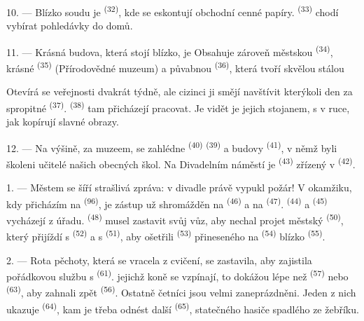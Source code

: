 10. --- Blízko soudu je  \textsuperscript{(32)}, kde se eskontují
obchodní cenné papíry.  \textsuperscript{(33)} chodí vybírat
pohledávky do domů.

\VUsaut{4.0mm}
\VUsaut{3.4mm}

11. --- Krásná budova, která stojí blízko, je  Obsahuje zároveň
městskou  \textsuperscript{(34)}, krásné  \textsuperscript{(35)} (Přírodovědné muzeum) a půvabnou 
\textsuperscript{(36)}, která tvoří skvělou stálou 

Otevírá se veřejnosti dvakrát týdně, ale cizinci ji smějí navštívit kterýkoli den za
spropitné  \textsuperscript{(37)}. 
\textsuperscript{(38)} tam přicházejí pracovat. Je vidět je  jejich
stojanem, s  v ruce, jak kopírují slavné obrazy.

12. --- Na výšině, za muzeem, se zahlédne  \textsuperscript{(40)}
 \textsuperscript{(39)} a budovy 
\textsuperscript{(41)}, v němž byli školeni učitelé našich obecných škol. Na Divadelním
náměstí je  \textsuperscript{(43)} zřízený v  \textsuperscript{(42)}.

\VUsaut{5.0mm}
\VUsaut{3.0mm}

\VUsaut{3.4mm}

1. --- Městem se šíří strašlivá zpráva: v divadle právě vypukl požár! V okamžiku, kdy
přicházím na  \textsuperscript{(96)}, je zástup už shromážděn na
 \textsuperscript{(46)} a na  \textsuperscript{(47)}.
 \textsuperscript{(44)} a 
\textsuperscript{(45)} vycházejí z úřadu. 
\textsuperscript{(48)} musel zastavit svůj vůz, aby nechal projet městský
 \textsuperscript{(50)}, který přijíždí s 
\textsuperscript{(52)} a s  \textsuperscript{(51)}, aby ošetřili
 \textsuperscript{(53)} přineseného na 
\textsuperscript{(54)} blízko  \textsuperscript{(55)}.

2. --- Rota pěchoty, která se vracela z cvičení, se zastavila, aby zajistila pořádkovou
službu s  \textsuperscript{(61)}.
 jejichž koně se vzpínají, to dokážou lépe než 
\textsuperscript{(57)} nebo  \textsuperscript{(63)}, aby zahnali zpět
 \textsuperscript{(56)}. Ostatně četníci jsou velmi zaneprázdněni.
Jeden z nich ukazuje  \textsuperscript{(64)}, kam je třeba odnést
další  \textsuperscript{(65)}, statečného hasiče spadlého ze žebříku.

